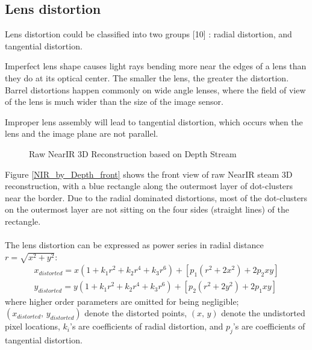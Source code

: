 \subsection{Lens distortion}
Lens distortion could be classified into two groups [10] : radial distortion, and tangential distortion.\par
%
Imperfect lens shape causes light rays bending more near the edges of a lens than they do at its optical center. The smaller the lens, the greater the distortion. Barrel distortions happen commonly on wide angle lenses, where the field of view of the lens is much wider than the size of the image sensor.\par%
Improper lens assembly will lead to tangential distortion, which occurs when the lens and the image plane are not parallel.\par%
%
 \begin{figure}[h]
{}
\caption{Raw NearIR 3D Reconstruction based on Depth Stream}
\label{NearIR}
\end{figure}%
%
Figure \ref{NIR_by_Depth_front} shows the front view of raw NearIR steam 3D reconstruction, with a blue rectangle along the outermost layer of dot-clusters near the border. Due to the radial dominated distortions, most of the dot-clusters on the outermost layer are not sitting on the four sides (straight lines) of the rectangle.\\\\
%
The lens distortion can be expressed as power series in radial distance \(r = \sqrt{x^2 + y^2}\):
\begin{equation}
%
\begin{aligned}
x_{distorted} =  x (1 + k_1 r^2 + k_2 r^4 + k_3 r^6) + [p_1 (r^2 + 2 x^2) + 2 p_2 xy] %
\\%
y_{distorted} =  y (1 + k_1 r^2 + k_2 r^4 + k_3 r^6) + [p_2 (r^2 + 2 y^2) + 2 p_1 xy]
\end{aligned}
\label{lensDistortion}
%
\end{equation}%
%
where higher order parameters are omitted for being negligible; \((x_{distorted}, \, y_{distorted})\) denote the distorted points, \((x, \, y)\) denote the undistorted pixel locations, \(k_i\)'s are coefficients of radial distortion, and \(p_j\)'s are coefficients of tangential distortion.\par
